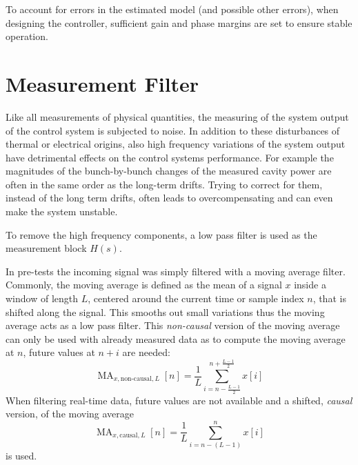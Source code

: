To account for errors in the estimated model (and possible other errors), when designing the controller, sufficient gain and phase margins are set to ensure stable operation.










\newpage
\section{Measurement Filter}\label{sec:measurementFilter}
Like all measurements of physical quantities, the measuring of the system output of the control system is subjected to noise.
In addition to these disturbances of thermal or electrical origins, also high frequency variations of the system output have detrimental effects on the control systems performance.
For example the magnitudes of the bunch-by-bunch changes of the measured cavity power are often in the same order as the long-term drifts.
Trying to correct for them, instead of the long term drifts, often leads to overcompensating and can even make the system unstable.

To remove the high frequency components, a low pass filter is used as the measurement block $H(s)$.

In pre-tests the incoming signal was simply filtered with a moving average filter.
Commonly, the moving average is defined as the mean of a signal $x$ inside a window of length $L$, centered around the current time or sample index $n$, that is shifted along the signal. This smooths out small variations thus the moving average acts as a low pass filter.
This \textit{non-causal} version of the moving average can only be used with already measured data as to compute the moving average at $n$, future values at $n+i$ are needed:
\begin{equation}
\operatorname{MA}_{x,\text{non-causal},L}[n] = \frac{1}{L} \sum_{i=n-\frac{L-1}{2}}^{n+\frac{L-1}{2}} x[i]
\end{equation}
When filtering real-time data, future values are not available and a shifted, \textit{causal} version, of the moving average
\begin{equation}\label{eq:causalMA}
\operatorname{MA}_{x,\text{causal},L}[n] = \frac{1}{L} \sum_{i=n-(L-1)}^{n} x[i]
\end{equation}
is used.

